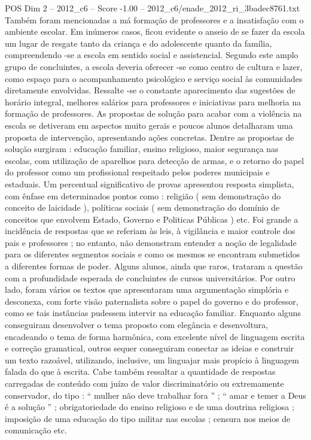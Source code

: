 \begin{textsample}{POS Dim 2 – 2012\_c6 – Score -1.00 – 2012\_c6/enade\_2012\_ri\_3badec8761.txt}
Também foram mencionadas a má formação de professores e a insatisfação com o ambiente escolar.
Em inúmeros casos, ficou evidente o anseio de se fazer da escola um lugar de resgate tanto da criança e do adolescente quanto da família, compreendendo -se a escola em sentido social e assistencial.
Segundo este amplo grupo de concluintes, a escola deveria oferecer -se como centro de cultura e lazer, como espaço para o acompanhamento psicológico e serviço social às comunidades diretamente envolvidas.
Ressalte -se o constante aparecimento das sugestões de horário integral, melhores salários para professores e iniciativas para melhoria na formação de professores.
As propostas de solução para acabar com a violência na escola se detiveram em aspectos muito gerais e poucos alunos detalharam uma proposta de intervenção, apresentando ações concretas.
Dentre as propostas de solução surgiram : educação familiar, ensino religioso, maior segurança nas escolas, com utilização de aparelhos para detecção de armas, e o retorno do papel do professor como um profissional respeitado pelos poderes municipais e estaduais.
Um percentual significativo de provas apresentou resposta simplista, com ênfase em determinados pontos como : religião ( sem demonstração do conceito de laicidade ), políticas sociais ( sem demonstração do domínio de conceitos que envolvem Estado, Governo e Politicas Públicas ) etc.
Foi grande a incidência de respostas que se referiam às leis, à vigilância e maior controle dos pais e professores ; no entanto, não demonstram entender a noção de legalidade para os diferentes segmentos sociais e como os mesmos se encontram submetidos a diferentes formas de poder.
Alguns alunos, ainda que raros, trataram a questão com a profundidade esperada de concluintes de cursos universitários.
Por outro lado, foram vários os textos que apresentaram uma argumentação simplória e desconexa, com forte visão paternalista sobre o papel do governo e do professor, como se tais instâncias pudessem intervir na educação familiar.
Enquanto alguns conseguiram desenvolver o tema proposto com elegância e desenvoltura, encadeando o tema de forma harmônica, com excelente nível de linguagem escrita e correção gramatical, outros sequer conseguiram conectar as ideias e construir um texto razoável, utilizando, inclusive, um linguajar mais propício à linguagem falada do que à escrita.
Cabe também ressaltar a quantidade de respostas carregadas de conteúdo com juízo de valor discriminatório ou extremamente conservador, do tipo : “ mulher não deve trabalhar fora ” ; “ amar e temer a Deus é a solução ” ; obrigatoriedade do ensino religioso e de uma doutrina religiosa ; imposição de uma educação do tipo militar nas escolas ; censura nos meios de comunicação etc.

\end{textsample}
